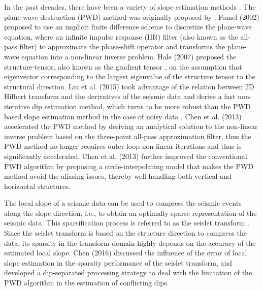 
In the past decades, there have been a variety of slope estimation methods . The plane-wave destruction (PWD) method was originally proposed by \cite{claerbout1992pvi}. Fomel (2002) \cite{fomel2002pwd} proposed to use an implicit finite difference scheme to discretize the plane-wave equation, where an infinite impulse response (IIR) filter (also known as the all-pass filter) to approximate the phase-shift operator and transforms the plane-wave equation into a non-linear inverse problem. Hale (2007) \cite{hale2007local} proposed the structure-tensor, also known as the gradient tensor \cite{van1995estimators},  on the assumption that eigenvector corresponding to the largest eigenvalue of the structure tensor  to the structural direction.  Liu et al. (2015) \cite{liuyang2015} took advantage of the relation between 2D Hilbert transform and the derivatives of the seismic data and derive a fast non-iterative dip estimation method, which turns to be more robust than the PWD based slope estimation method in the case of noisy data \cite{yangkang2018gji3}. Chen et al. (2013) \cite{zhonghuan2013accelerated} accelerated the PWD method by deriving an analytical solution to the non-linear inverse problem based on the three-point all-pass approximation filter, thus the PWD method no longer requires outer-loop non-linear iterations and thus is significantly accelerated. Chen et al. (2013) \cite{zhonghuan2013omnidirectional} further improved the conventional PWD algorithm by proposing a circle-interpolating model that makes the PWD method avoid the aliasing issues, thereby well handling both vertical and horizontal structures.

The local slope of a seismic data can be used to compress the seismic events along the slope direction, i.e., to obtain an optimally sparse representation of the seismic data. This sparsification process is referred to as the seislet transform \cite{fomel2010seislet}. Since the seislet transform is based on the structure direction to compress the data, its sparsity in the transform domain highly depends on the accuracy of the estimated local slope. Chen (2016) \cite{yangkang2016emd} discussed the influence of the error of local slope estimation in the sparsity performance of the seislet transform, and developed a dip-separated processing strategy to deal with the limitation of the PWD algorithm in the estimation of conflicting dips. 

